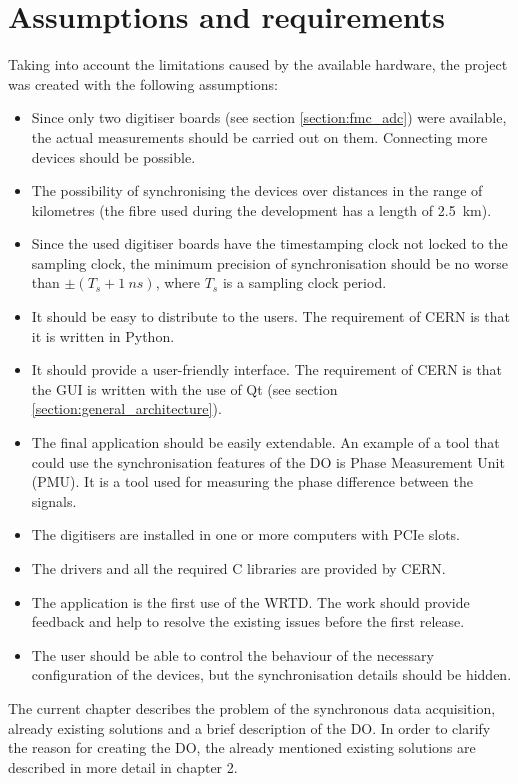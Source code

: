 \section{Assumptions and requirements} \label{section:assumptions_and_requirements}
    Taking into account the limitations caused by the available hardware, the project was created with the following assumptions:
    \begin{itemize}
        \item Since only two digitiser boards (see section \ref{section:fmc_adc}) were available, the actual measurements should be carried out on them. Connecting more devices should be possible.
        \item The possibility of synchronising the devices over distances in the range of kilometres (the fibre used during the development has a length of 2.5~km).
        \item Since the used digitiser boards have the timestamping clock not locked to the sampling clock, the minimum precision of synchronisation should be no worse than $\pm (T_s + 1~ns)$, where $T_s$ is a sampling clock period.
        \item It should be easy to distribute to the users. The requirement of CERN is that it is written in Python.
        \item It should provide a user-friendly interface. The requirement of CERN is that the GUI is written with the use of Qt (see section \ref{section:general_architecture}).
        \item The final application should be easily extendable. An example of a tool that could use the synchronisation features of the DO is Phase Measurement Unit (PMU). It is a tool used for measuring the phase difference between the signals.
        \item The digitisers are installed in one or more computers with PCIe slots.
        \item The drivers and all the required C libraries are provided by CERN.
        \item The application is the first use of the WRTD. The work should provide feedback and help to resolve the existing issues before the first release.
        \item The user should be able to control the behaviour of the necessary configuration of the devices, but the synchronisation details should be hidden.
    \end{itemize}

The current chapter describes the problem of the synchronous data acquisition, already existing solutions and a brief description of the DO. In order to clarify the reason for creating the DO, the already mentioned existing solutions are described in more detail in chapter 2.



